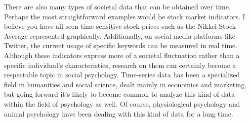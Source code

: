 \documentclass{ltjsbook}
\begin{document}
There are also many types of societal data that can be obtained over time. Perhaps the most straightforward examples would be stock market indicators. I believe you have all seen time-sensitive stock prices such as the Nikkei Stock Average represented graphically. Additionally, on social media platforms like Twitter, the current usage of specific keywords can be measured in real time. Although these indicators express more of a societal fluctuation rather than a specific individual's characteristics, research on them can certainly become a respectable topic in social psychology. Time-series data has been a specialized field in humanities and social science, dealt mainly in economics and marketing, but going forward it's likely to become common to analyze this kind of data within the field of psychology as well. Of course, physiological psychology and animal psychology have been dealing with this kind of data for a long time.
\end{document}
